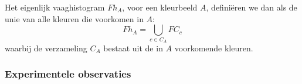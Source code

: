 Het eigenlijk vaaghistogram $Fh_A$, voor een kleurbeeld $A$, defini\"eren we dan als de unie van 
alle kleuren die voorkomen in $A$:
$$
Fh_A = \displaystyle\bigcup_{c \in C_A} FC_c
$$ 
waarbij de verzameling $C_A$ bestaat uit de in $A$ voorkomende kleuren.

\subsubsection{Experimentele observaties}